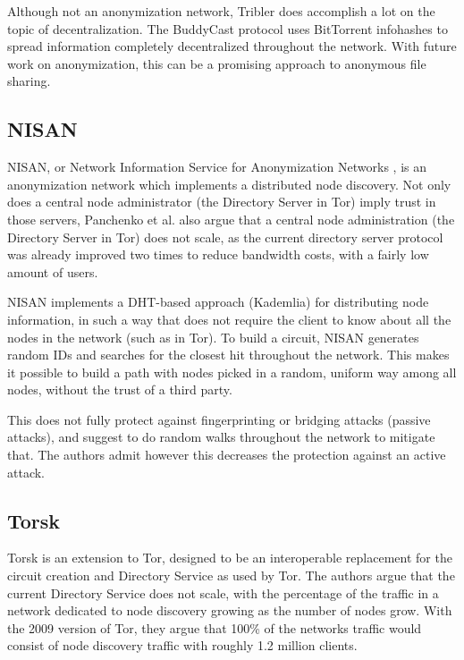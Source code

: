 \documentclass{article}
\begin{document}
		Although not an anonymization network, Tribler does accomplish a lot on the topic of decentralization. The BuddyCast protocol uses BitTorrent infohashes to spread information completely decentralized throughout the network. With future work on anonymization, this can be a promising approach to anonymous file sharing.

	\subsection{NISAN} %
		NISAN, or Network Information Service for Anonymization Networks \cite{panchenko2006nisan}, is an anonymization network which implements a distributed node discovery. Not only does a central node administrator (the Directory Server in Tor) imply trust in those servers, Panchenko et al. also argue that a central node administration (the Directory Server in Tor) does not scale, as the current directory server protocol was already improved two times to reduce bandwidth costs, with a fairly low amount of users.
		
		NISAN implements a DHT-based approach (Kademlia) for distributing node information, in such a way that does not require the client to know about all the nodes in the network (such as in Tor). To build a circuit, NISAN generates random IDs and searches for the closest hit throughout the network. This makes it possible to build a path with nodes picked in a random, uniform way among all nodes, without the trust of a third party.
		
		This does not fully protect against fingerprinting or bridging attacks (passive attacks), and suggest to do random walks throughout the network to mitigate that. The authors admit however this decreases the protection against an active attack.
		
	\subsection{Torsk} %
		Torsk \cite{mclachlan2009scalable} is an extension to Tor, designed to be an interoperable replacement for the circuit creation and Directory Service as used by Tor. The authors argue that the current Directory Service does not scale, with the percentage of the traffic in a network dedicated to node discovery growing as the number of nodes grow. With the 2009 version of Tor, they argue that 100\% of the networks traffic would consist of node discovery traffic with roughly 1.2 million clients. 
		
\end{document}
